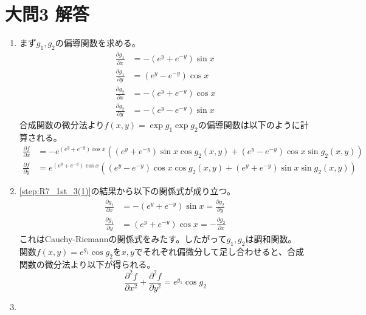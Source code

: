 \documentclass[dvipdfmx]{jsreport}
\begin{document}
\section{大問3 解答}
\begin{souanswer} %
\begin{enumerate}
	\item \label{step:R7_1st_3(1)}まず$g_1, g_2$の偏導関数を求める。
\begin{align*}
	\frac{\partial g_1}{\partial x}&= -(e^y+ e^{-y})\sin{x}\\
	\frac{\partial g_1}{\partial y}&= (e^y- e^{-y})\cos{x}\\
	\frac{\partial g_2}{\partial x}&= -(e^y+ e^{-y})\cos{x}\\
	\frac{\partial g_2}{\partial y}&= -(e^y- e^{-y})\sin{x}
\end{align*}
	合成関数の微分法より$f(x, y)= \exp{g_1}\exp{g_2}$の偏導関数は以下のように計算される。
\begin{align*}
	\frac{\partial f}{\partial x}&= -e^{(e^y+ e^{-y})\cos{x}}((e^y+ e^{-y})\sin{x}\cos{g_2(x, y)+ (e^y- e^{-y})}\cos{x}\sin{g_2(x, y)})\\
	\frac{\partial f}{\partial y}&= e^{(e^y+ e^{-y})\cos{x}}((e^y- e^{-y})\cos{x}\cos{g_2(x, y)}+ (e^y+ e^{-y})\sin{x}\sin{g_2(x, y)})
\end{align*}
	\item \ref{step:R7_1st_3(1)}の結果から以下の関係式が成り立つ。
\begin{align*}
	\frac{\partial g_1}{\partial x}&= -(e^y+ e^{-y})\sin{x}= \frac{\partial g_2}{\partial y}\\
	\frac{\partial g_1}{\partial y}&= (e^y+ e^{-y})\cos{x}= -\frac{\partial g_2}{\partial x}
\end{align*}
	これはCauchy-Riemannの関係式をみたす。したがって$g_1, g_2$は調和関数。\\
	関数$f(x, y)= e^{g_1}\cos{g_2}$を$x, y$でそれぞれ偏微分して足し合わせると、合成関数の微分法より以下が得られる。
\begin{equation*}
	\frac{\partial^2 f}{\partial x^2}+ \frac{\partial^2 f}{\partial y^2}= e^{g_1}\cos{g_2}
\end{equation*}
	\item 
\end{enumerate}
\end{souanswer}
\end{document}
